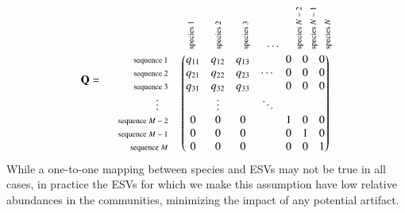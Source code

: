 \documentclass[a4paper,10pt]{article}
\begin{document}
\begin{equation}
\mathbf{Q} = \; \; \; \; \; \begin{matrix}
 & 

\begin{matrix}
\; \; \;
\rotatebox{90}{\scriptsize species 1} \; \; \; & 
\rotatebox{90}{\scriptsize species 2} \; \; \; &
\rotatebox{90}{\scriptsize species 3} \; \; &
\cdots \; \; &
\rotatebox{90}{\scriptsize species $N-2$} \! \! & 
\rotatebox{90}{\scriptsize species $N-1$} \! \! &
\rotatebox{90}{\scriptsize species $N$}
\end{matrix}

\\ 

\begin{matrix*}[r]
\rotatebox{0}{\scriptsize sequence 1} \\
\rotatebox{0}{\scriptsize sequence 2} \\
\rotatebox{0}{\scriptsize sequence 3} \\
\vdots \; \; \; \\
\rotatebox{0}{\scriptsize sequence $M-2$} \\ 
\rotatebox{0}{\scriptsize sequence $M-1$} \\
\rotatebox{0}{\scriptsize sequence $M$}
\end{matrix*}

& 

\begin{pmatrix}
q_{11} & q_{12} & q_{13} &  & 0 & 0 & 0 \\
q_{21} & q_{22} & q_{23} & \cdots & 0 & 0 & 0 \\
q_{31} & q_{32} & q_{33} &  & 0 & 0 & 0 \\
 & \vdots &  & \ddots  &  &  &  \\
0 & 0 & 0 &  & 1 & 0 & 0 \\ 
0 & 0 & 0 &  & 0 & 1 & 0 \\ 
0 & 0 & 0 &  & 0 & 0 & 1 
\end{pmatrix}

\end{matrix}
\label{supp-eqn:Q_modified}
\end{equation}
%
While a one-to-one mapping between species and ESVs may not be true in all cases,
in practice the ESVs for which we make this assumption have low relative
abundances in the communities, minimizing the impact of any potential artifact.
\end{document}
